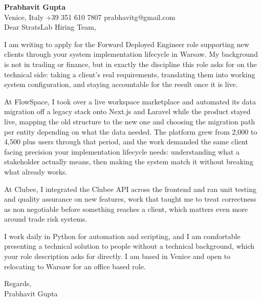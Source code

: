 \documentclass[a4paper,10.5pt]{article}
\begin{document}
\textbf{Prabhavit Gupta}\\
Venice, Italy \textbar{} +39 351 610 7807 \textbar{} prabhavitg@gmail.com\\[10pt]
Dear StratsLab Hiring Team,

I am writing to apply for the Forward Deployed Engineer role supporting new clients through your system implementation lifecycle in Warsaw. My background is not in trading or finance, but in exactly the discipline this role asks for on the technical side: taking a client's real requirements, translating them into working system configuration, and staying accountable for the result once it is live.

At FlowSpace, I took over a live workspace marketplace and automated its data migration off a legacy stack onto Next.js and Laravel while the product stayed live, mapping the old structure to the new one and choosing the migration path per entity depending on what the data needed. The platform grew from 2,000 to 4,500 plus users through that period, and the work demanded the same client facing precision your implementation lifecycle needs: understanding what a stakeholder actually means, then making the system match it without breaking what already works.

At Clubee, I integrated the Clubee API across the frontend and ran unit testing and quality assurance on new features, work that taught me to treat correctness as non negotiable before something reaches a client, which matters even more around trade risk systems.

I work daily in Python for automation and scripting, and I am comfortable presenting a technical solution to people without a technical background, which your role description asks for directly. I am based in Venice and open to relocating to Warsaw for an office based role.

Regards,\\
Prabhavit Gupta
\end{document}
